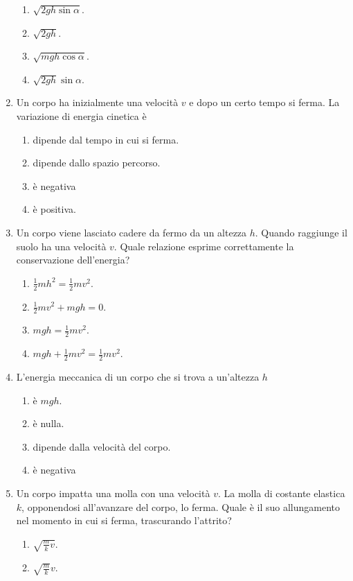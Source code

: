 \documentclass{article}
\begin{document}
\begin{enumerate}
  \begin{enumerate}[label=\Alph*.]
    \item $\sqrt{2gh\sin\alpha}$.
    \item $\sqrt{2gh}$.
    \item $\sqrt{mgh\cos\alpha}$.
    \item $\sqrt{2gh}\sin\alpha$.
  \end{enumerate}
  \item Un corpo ha inizialmente una velocità $v$ e dopo un certo tempo si ferma. La variazione di energia cinetica è
  \begin{enumerate}[label=\Alph*.]
    \item dipende dal tempo in cui si ferma.
    \item dipende dallo spazio percorso.
    \item è negativa
    \item è positiva.
  \end{enumerate}
  \item Un corpo viene lasciato cadere da fermo da un altezza $h$. Quando raggiunge il suolo ha una velocità $v$. Quale relazione esprime correttamente la conservazione dell'energia?
  \begin{enumerate}[label=\Alph*.]
    \item $\frac{1}{2}mh^2=\frac{1}{2}mv^2$.
    \item $\frac{1}{2}mv^2+mgh=0.$
    \item $mgh=\frac{1}{2}mv^2$.
    \item $mgh+\frac{1}{2}mv^2=\frac{1}{2}mv^2.$
  \end{enumerate}
  \item L'energia meccanica di un corpo che si trova a un'altezza $h$
  \begin{enumerate}[label=\Alph*.]
    \item è $mgh$.
    \item è nulla.
    \item dipende dalla velocità del corpo.
    \item è negativa
  \end{enumerate}
  \item Un corpo impatta una molla con una velocità $v$. La molla di costante elastica $k$, opponendosi all'avanzare del corpo, lo ferma. Quale è il suo allungamento nel momento in cui si ferma, trascurando l'attrito?
  \begin{enumerate}[label=\Alph*.]
    \item $\sqrt{\frac{m}{k}v}$.
    \item $\sqrt{\frac{m}{k}}v$.

\end{enumerate}
\end{enumerate}
\end{document}
